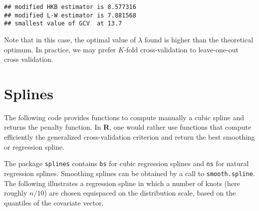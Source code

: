 \documentclass[]{book}
\theoremstyle{definition}
\theoremstyle{definition}
\theoremstyle{definition}
\theoremstyle{remark}
\begin{document}
\begin{verbatim}
## modified HKB estimator is 8.577316 
## modified L-W estimator is 7.881568 
## smallest value of GCV  at 13.7
\end{verbatim}

Note that in this case, the optimal value of \(\lambda\) found is higher
than the theoretical optimum. In practice, we may prefer \(K\)-fold
cross-validation to leave-one-out cross validation.

\hypertarget{splines}{%
\chapter{Splines}\label{splines}}

The following code provides functions to compute manually a cubic spline
and returns the penalty function. In \textbf{R}, one would rather use
functions that compute efficiently the generalized cross-validation
criterion and return the best smoothing or regression spline.

The package \texttt{splines} contains \texttt{bs} for cubic regression
splines and \texttt{ns} for natural regression splines. Smoothing
splines can be obtained by a call to \texttt{smooth.spline}. The
following illustrates a regression spline in which a number of knots
(here roughly \(n/10\)) are chosen equispaced on the distribution scale,
based on the quantiles of the covariate vector.
\end{document}

